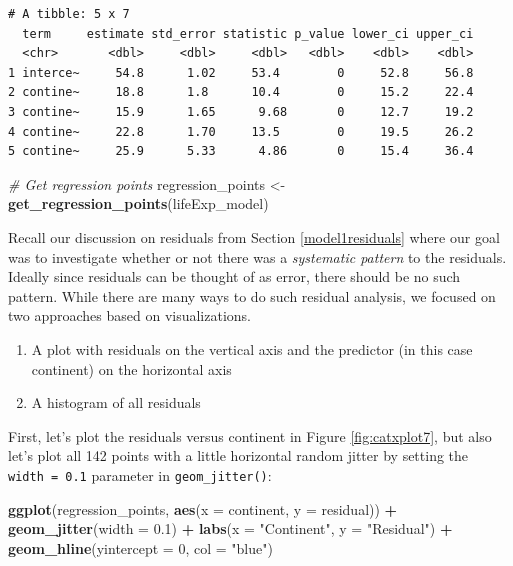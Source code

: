 \documentclass[12pt, krantz2,]{krantz}
\makeatletter
\newenvironment{Shaded}{\begin{snugshade}}{\end{snugshade}}
\newcommand{\CommentTok}[1]{\textcolor[rgb]{0.37,0.37,0.37}{\textit{#1}}}
\newcommand{\DataTypeTok}[1]{\textcolor[rgb]{0.27,0.27,0.27}{#1}}
\newcommand{\DecValTok}[1]{\textcolor[rgb]{0.06,0.06,0.06}{#1}}
\newcommand{\FloatTok}[1]{\textcolor[rgb]{0.06,0.06,0.06}{#1}}
\newcommand{\KeywordTok}[1]{\textcolor[rgb]{0.27,0.27,0.27}{\textbf{#1}}}
\newcommand{\NormalTok}[1]{#1}
\newcommand{\OperatorTok}[1]{\textcolor[rgb]{0.43,0.43,0.43}{\textbf{#1}}}
\newcommand{\StringTok}[1]{\textcolor[rgb]{0.5,0.5,0.5}{#1}}
\providecommand{\tightlist}{%
  \setlength{\itemsep}{0pt}\setlength{\parskip}{0pt}}
\newenvironment{kframe}{%
\medskip{}
\setlength{\fboxsep}{.8em}
 \def\at@end@of@kframe{}%
 \ifinner\ifhmode%
  \def\at@end@of@kframe{\end{minipage}}%
  \begin{minipage}{\columnwidth}%
 \fi\fi%
 \def\FrameCommand##1{\hskip\@totalleftmargin \hskip-\fboxsep
 \colorbox{shadecolor}{##1}\hskip-\fboxsep
     \hskip-\linewidth \hskip-\@totalleftmargin \hskip\columnwidth}%
 \MakeFramed {\advance\hsize-\width
   \@totalleftmargin\z@ \linewidth\hsize
   \@setminipage}}%
 {\par\unskip\endMakeFramed%
 \at@end@of@kframe}
\renewenvironment{Shaded}{\begin{kframe}}{\end{kframe}}
\makeatother
\begin{document}
\begin{verbatim}
# A tibble: 5 x 7
  term     estimate std_error statistic p_value lower_ci upper_ci
  <chr>       <dbl>     <dbl>     <dbl>   <dbl>    <dbl>    <dbl>
1 interce~     54.8      1.02     53.4        0     52.8     56.8
2 contine~     18.8      1.8      10.4        0     15.2     22.4
3 contine~     15.9      1.65      9.68       0     12.7     19.2
4 contine~     22.8      1.70     13.5        0     19.5     26.2
5 contine~     25.9      5.33      4.86       0     15.4     36.4
\end{verbatim}

\begin{Shaded}
\begin{Highlighting}[]
\CommentTok{# Get regression points}
\NormalTok{regression_points <-}\StringTok{ }\KeywordTok{get_regression_points}\NormalTok{(lifeExp_model)}
\end{Highlighting}
\end{Shaded}

Recall our discussion on residuals from Section \ref{model1residuals} where our goal was to investigate whether or not there was a \emph{systematic pattern} to the residuals. Ideally since residuals can be thought of as error, there should be no such pattern. While there are many ways to do such residual analysis, we focused on two approaches based on visualizations.

\begin{enumerate}
\def\labelenumi{\arabic{enumi}.}
\tightlist
\item
  A plot with residuals on the vertical axis and the predictor (in this case continent) on the horizontal axis
\item
  A histogram of all residuals
\end{enumerate}

First, let's plot the residuals versus continent in Figure \ref{fig:catxplot7}, but also let's plot all 142 points with a little horizontal random jitter by setting the \texttt{width\ =\ 0.1} parameter in \texttt{geom\_jitter()}:

\begin{Shaded}
\begin{Highlighting}[]
\KeywordTok{ggplot}\NormalTok{(regression_points, }\KeywordTok{aes}\NormalTok{(}\DataTypeTok{x =}\NormalTok{ continent, }\DataTypeTok{y =}\NormalTok{ residual)) }\OperatorTok{+}
\StringTok{  }\KeywordTok{geom_jitter}\NormalTok{(}\DataTypeTok{width =} \FloatTok{0.1}\NormalTok{) }\OperatorTok{+}\StringTok{ }
\StringTok{  }\KeywordTok{labs}\NormalTok{(}\DataTypeTok{x =} \StringTok{"Continent"}\NormalTok{, }\DataTypeTok{y =} \StringTok{"Residual"}\NormalTok{) }\OperatorTok{+}
\StringTok{  }\KeywordTok{geom_hline}\NormalTok{(}\DataTypeTok{yintercept =} \DecValTok{0}\NormalTok{, }\DataTypeTok{col =} \StringTok{"blue"}\NormalTok{)}
\end{Highlighting}
\end{Shaded}
\end{document}
